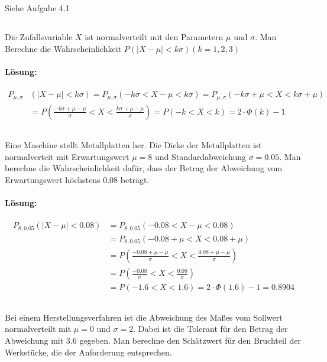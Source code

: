 \documentclass[ngerman]{scrartcl}
\begin{document}
\subsection{}
Siehe Aufgabe 4.1

\subsection{}
Die Zufallsvariable $X$ ist normalverteilt mit den Parametern $\mu$ und $\sigma$. Man Berechne die Wahrscheinlichkeit $P(|X-\mu| < k\sigma) (k = 1,2,3)$
\paragraph{Lösung:}
\begin{align*}
P_{\mu,\sigma}&(|X-\mu| < k\sigma) = P_{\mu,\sigma}(-k\sigma <X-\mu < k\sigma) = P_{\mu,\sigma}(-k\sigma + \mu < X < k\sigma + \mu)\\
&= P\left(\frac{-k\sigma + \mu -\mu}{\sigma} < X < \frac{k\sigma + \mu -\mu}{\sigma}\right) = P(-k < X < k ) = 2\cdot \Phi(k) - 1
\end{align*}

\subsection{}
Eine Maschine stellt Metallplatten her. Die Dicke der Metallplatten ist normalverteit mit Erwartungswert $\mu = 8$ und Standardabweichung $\sigma = 0.05$. Man berechne die Wahrscheinlichkeit dafür, dass der Betrag der Abweichung vom Erwartungswert höchstens 0.08 beträgt.
\paragraph{Lösung:} 
\begin{align*}
P_{8,0.05}(|X- \mu| < 0.08) &= P_{8,0.05}(-0.08 < X - \mu < 0.08) \\
&= P_{8,0.05}(-0.08 + \mu < X < 0.08 + \mu)\\
&= P\left(\frac{-0.08 + \mu - \mu}{\sigma} < X < \frac{0.08 + \mu - \mu}{\sigma}\right) \\
&= P\left(\frac{-0.08}{\sigma} < X < \frac{0.08}{\sigma}\right)\\
&= P(-1.6 < X < 1.6) = 2\cdot \Phi(1.6) - 1 = 0.8904
\end{align*}

\subsection{}
Bei einem Herstellungsverfahren ist die Abweichung des Maßes vom Sollwert normalverteilt mit $\mu =0$ und $\sigma = 2$. Dabei ist die Tolerant für den Betrag der Abweichung mit 3.6 gegeben. Man berechne den Schätzwert für den Bruchteil der Werkstücke, die der Anforderung entsprechen.
\end{document}

